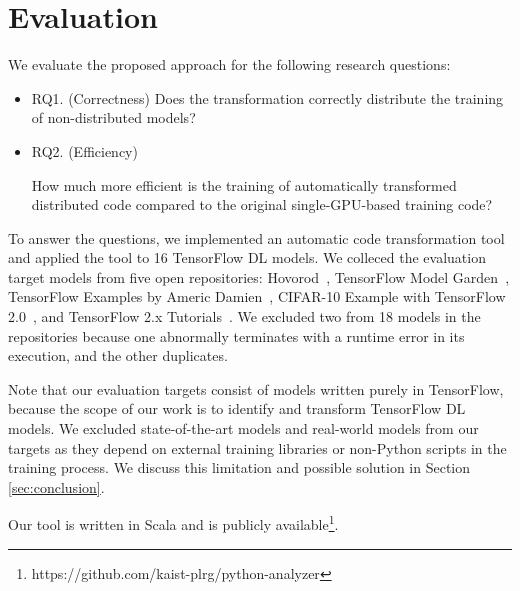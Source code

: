\section{Evaluation}\label{sec:eval}
We evaluate the proposed approach for the following research questions:
\begin{itemize}
\item RQ1. (Correctness) Does the transformation correctly distribute the
  training of non-distributed models?
\item RQ2. (Efficiency) 
    \begin{inred}
        How much more efficient is the training of automatically transformed 
        distributed code compared to the original single-GPU-based training code?
    \end{inred}
\end{itemize}

\noindent
To answer the questions, we implemented an automatic code transformation tool
and applied the tool to 16 TensorFlow DL models.
We colleced the evaluation target models from five open repositories: 
Hovorod~\cite{horovodgithub}, TensorFlow Model Garden~\cite{tfmodelgarden},
TensorFlow Examples by Americ Damien~\cite{tfexamplesdamien},
CIFAR-10 Example with TensorFlow 2.0~\cite{cifar10github}, and
TensorFlow 2.x Tutorials~\cite{tf2tutogithub}.
We excluded two from 18 models in the repositories because one abnormally
terminates with a runtime error in its execution, and the other duplicates.
\begin{inred}
Note that our evaluation targets consist of models written purely in
TensorFlow, because the scope of our work is to identify and
transform TensorFlow DL models.
We excluded state-of-the-art models and real-world models from our targets
as they depend on external training libraries or non-Python scripts
in the training process.
We discuss this limitation and possible solution
in Section \ref{sec:conclusion}.
\end{inred}
Our tool is written in Scala and is publicly
available\footnote{https://github.com/kaist-plrg/python-analyzer}.

